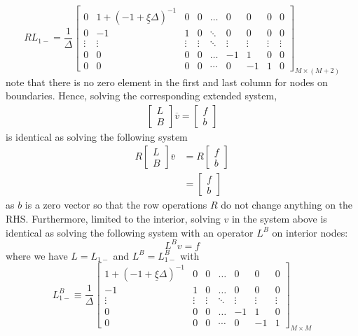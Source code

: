 \documentclass[11pt]{article}
\theoremstyle{definition}
\begin{document}
\begin{equation}
R {L}_{1-} = \dfrac{1}{\Delta} \begin{bmatrix}
0&1 + (-1 + \underline{\xi}\Delta )^{-1}&0&0&\dots&0&0&0&0\\
0&-1&1&0&\ddots&0&0&0&0\\
\vdots&\vdots&\vdots&\vdots&\ddots&\vdots&\vdots&\vdots&\vdots\\
0&0&0&0&\dots&-1&1&0&0\\
0&0&0&0&\cdots&0&-1&1&0
\end{bmatrix}_{M\times (M+2)}
\end{equation}
note that there is no zero element in the first and last column for nodes on boundaries. Hence, solving the corresponding extended system,
\begin{align}
\begin{bmatrix}
{L}\\
B
\end{bmatrix} 
\overline{v} 
=
\begin{bmatrix}
f \\ b
\end{bmatrix}
\end{align}
is identical as solving the following system
\begin{align}
R
\begin{bmatrix}
{L}\\
B
\end{bmatrix} 
\overline{v} 
&=
R
\begin{bmatrix}
f \\ b
\end{bmatrix} \\
&= \begin{bmatrix}
f \\ b
\end{bmatrix}
\end{align}
as $b$ is a zero vector so that the row operations $R$ do not change anything on the RHS. Furthermore, limited to the interior, solving $v$ in the system above is identical as solving the following system with an operator $L^B$ on interior nodes:
\begin{equation}\label{eq:system-on-interior}
L^B v = f
\end{equation}
where we have ${L} = {L}_{1-}$ and $L^B = L_{1-}^B$ with
\begin{equation}
L_{1-}^B \equiv \frac{1}{\Delta}\begin{bmatrix}
1 + (-1 + \underline{\xi} \Delta)^{-1} &0&0&\dots&0&0&0\\
-1&1&0&\dots&0&0&0\\
\vdots&\vdots&\vdots&\ddots&\vdots&\vdots&\vdots\\
0&0&0&\dots&-1&1&0\\
0&0&0&\cdots&0&-1&1
\end{bmatrix}_{M\times M} \label{eq:L-1-regular}
\end{equation}
\end{document}
